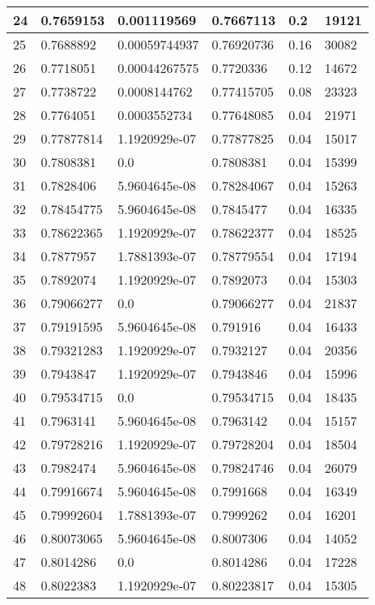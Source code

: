 \begin{longtable}{|l|l|l|l|l|l|}
24 & 0.7659153 & 0.001119569 & 0.7667113 & 0.2 & 19121 \\ \hline 
25 & 0.7688892 & 0.00059744937 & 0.76920736 & 0.16 & 30082 \\ \hline 
26 & 0.7718051 & 0.00044267575 & 0.7720336 & 0.12 & 14672 \\ \hline 
27 & 0.7738722 & 0.0008144762 & 0.77415705 & 0.08 & 23323 \\ \hline 
28 & 0.7764051 & 0.0003552734 & 0.77648085 & 0.04 & 21971 \\ \hline 
29 & 0.77877814 & 1.1920929e-07 & 0.77877825 & 0.04 & 15017 \\ \hline 
30 & 0.7808381 & 0.0 & 0.7808381 & 0.04 & 15399 \\ \hline 
31 & 0.7828406 & 5.9604645e-08 & 0.78284067 & 0.04 & 15263 \\ \hline 
32 & 0.78454775 & 5.9604645e-08 & 0.7845477 & 0.04 & 16335 \\ \hline 
33 & 0.78622365 & 1.1920929e-07 & 0.78622377 & 0.04 & 18525 \\ \hline 
34 & 0.7877957 & 1.7881393e-07 & 0.78779554 & 0.04 & 17194 \\ \hline 
35 & 0.7892074 & 1.1920929e-07 & 0.7892073 & 0.04 & 15303 \\ \hline 
36 & 0.79066277 & 0.0 & 0.79066277 & 0.04 & 21837 \\ \hline 
37 & 0.79191595 & 5.9604645e-08 & 0.791916 & 0.04 & 16433 \\ \hline 
38 & 0.79321283 & 1.1920929e-07 & 0.7932127 & 0.04 & 20356 \\ \hline 
39 & 0.7943847 & 1.1920929e-07 & 0.7943846 & 0.04 & 15996 \\ \hline 
40 & 0.79534715 & 0.0 & 0.79534715 & 0.04 & 18435 \\ \hline 
41 & 0.7963141 & 5.9604645e-08 & 0.7963142 & 0.04 & 15157 \\ \hline 
42 & 0.79728216 & 1.1920929e-07 & 0.79728204 & 0.04 & 18504 \\ \hline 
43 & 0.7982474 & 5.9604645e-08 & 0.79824746 & 0.04 & 26079 \\ \hline 
44 & 0.79916674 & 5.9604645e-08 & 0.7991668 & 0.04 & 16349 \\ \hline 
45 & 0.79992604 & 1.7881393e-07 & 0.7999262 & 0.04 & 16201 \\ \hline 
46 & 0.80073065 & 5.9604645e-08 & 0.8007306 & 0.04 & 14052 \\ \hline 
47 & 0.8014286 & 0.0 & 0.8014286 & 0.04 & 17228 \\ \hline 
48 & 0.8022383 & 1.1920929e-07 & 0.80223817 & 0.04 & 15305 \\ \hline 

\end{longtable}
